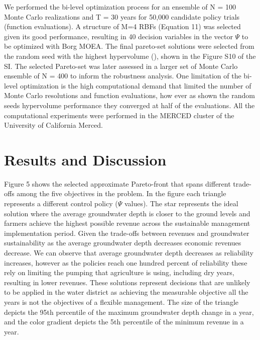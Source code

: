 \documentclass[11pt,a4paper]{article}
\begin{document}
We performed the bi-level optimization process for an ensemble of N = 100 Monte Carlo realizations and T = 30 years for 50,000 candidate policy trials (function evaluations). A structure of M=4 RBFs (Equation 11) was selected given its good performance, resulting in 40 decision variables in the vector $\Psi$ to be optimized with Borg MOEA. The final pareto-set solutions were selected from the random seed with the highest hypervolume (\cite{hadka_large-scale_2015,reed_evolutionary_2013}), shown in the Figure S10 of the SI. The selected Pareto-set was later assessed in a larger set of Monte Carlo ensemble of N = 400 to inform the robustness analysis. One limitation of the bi-level optimization is the high computational demand that limited the number of Monte Carlo resolutions and function evaluations, how ever as shown the random seeds hypervolume performance they converged at half of the evaluations. All the computational experiments were performed in the MERCED cluster of the University of California Merced. 


\section{Results and Discussion}

Figure 5 shows the selected approximate Pareto-front that spans different trade-offs among the five objectives in the problem. In the figure each triangle represents a different control policy ($\Psi$ values). The star represents the ideal solution where the average groundwater depth is closer to the ground levels and farmers achieve the highest possible revenue across the sustainable management implementation period. Given the trade-offs between revenues and groundwater sustainability as the average groundwater depth decreases economic revenues decrease. We can observe that average groundwater depth decreases as reliability increases, however as the policies reach one hundred percent of reliability these rely on limiting the pumping that agriculture is using, including dry years, resulting in lower revenues. These solutions represent decisions that are unlikely to be applied in the water district as achieving the measurable objective all the years is not the objectives of a flexible management. The size of the triangle depicts the 95th percentile of the maximum groundwater depth change in a year, and the color gradient depicts the 5th percentile of the minimum revenue in a year. 
\end{document}
